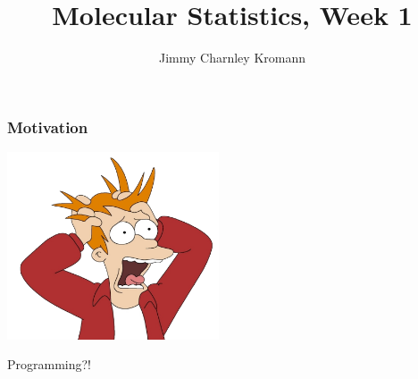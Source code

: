 \documentclass{beamer}
\title[]{Molecular Statistics, Week 1}
\institute[University of Copenhagen]{Department of Chemistry \\ University of Copenhagen}
\author[Jimmy Charnley Kromann]{Jimmy Charnley Kromann}
\date{}
\begin{document}
\frame[plain]{\titlepage}


\begin{frame}[fragile]

    \frametitle{Motivation}

    \begin{center}
        \includegraphics[width=0.47\textwidth]{images/panic.png}

        Programming?!

    \end{center}

\end{frame}
\end{document}
